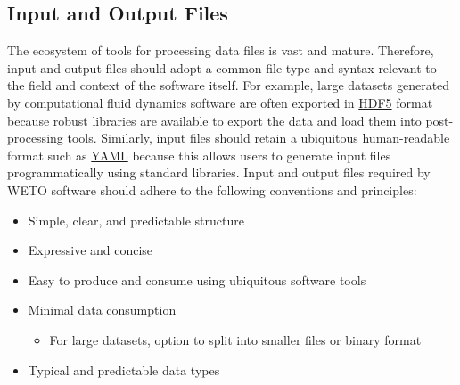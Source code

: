 \documentclass[]{nrel}
\begin{document}
\subsection{Input and Output Files}
The ecosystem of tools for processing data files is vast and mature.
Therefore, input and output files should adopt a common file type and syntax relevant to the
field and context of the software itself.
For example, large datasets generated by computational fluid dynamics software are often
exported in \href{https://www.hdfgroup.org/solutions/hdf5/}{HDF5} format because robust
libraries are available to export the data and load them into post-processing tools.
Similarly, input files should retain a ubiquitous human-readable format such as
\href{https://yaml.org}{YAML} because this allows users to generate input files programmatically
using standard libraries. Input and output files required by WETO software should
adhere to the following conventions and principles:

\begin{itemize}
\item Simple, clear, and predictable structure
\item Expressive and concise
\item Easy to produce and consume using ubiquitous software tools

\item Minimal data consumption
\begin{itemize}
    \item For large datasets, option to split into smaller files or binary format
\end{itemize}

\item Typical and predictable data types

\end{itemize}
\end{document}
